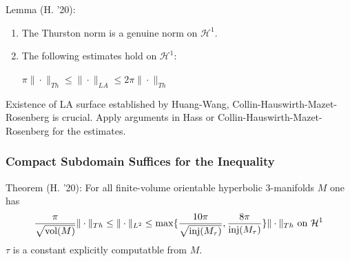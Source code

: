 \documentclass[t]{beamer}
\newcommand{\R}{\mathbb{R}}
\newcommand{\Hy}{\mathbb{H}^3}
\newcommand{\ds}{\displaystyle}
\newcommand{\lh}{\mathcal{H}^1}
\begin{document}
\begin{frame}[t]
	\begin{block}{Lemma (H. '20):}
		\begin{enumerate}
			\item The Thurston norm is a genuine norm on $\lh$.
			\item The following estimates hold on $\lh$: 
			\begin{center}
				$\pi \| \cdot \|_{Th} \leq \| \cdot \|_{LA} \leq 2\pi \| \cdot \|_{Th}$
			\end{center}
		\end{enumerate}
		
	\end{block}
	Existence of LA surface established by Huang-Wang, Collin-Hauswirth-Mazet-Rosenberg is crucial. Apply arguments in Hass or Collin-Hauswirth-Mazet-Rosenberg for the estimates.  
\end{frame}

\begin{frame}[t]
	\frametitle{Compact Subdomain Suffices for the Inequality}
	\begin{block}{Theorem (H. '20):}
		For all finite-volume orientable hyperbolic $3$-manifolds $M$ one has 
		\begin{equation}
			\ds \frac{\pi}{\sqrt{\text{vol}(M)}} \| \cdot \|_{Th} \leq \| \cdot \|_{L^2} \leq \max\{\frac{10\pi}{\sqrt{\text{inj}(M_{\tau})}}, \frac{8\pi}{\text{inj}(M_{\tau})} \}  \| \cdot \|_{Th} \textnormal{ on } \lh
		\end{equation}
		$\tau$ is a constant explicitly computatble from $M$. 
	\end{block}
\end{frame}

\end{document}
